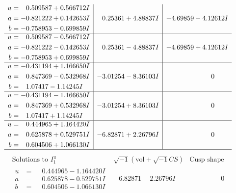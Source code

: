 \documentclass[1p]{elsarticle_modified}
\theoremstyle{definition}
\newcommand{\I}{\sqrt{-1}}
\begin{document}
$$\begin{array}{c|c|c}
\begin{aligned}
u &= \phantom{-}0.509587 + 0.566712 I \\
a &= -0.821222 + 0.142653 I \\
b &= -0.758953 - 0.699859 I\end{aligned}
 & \phantom{-}0.25361 + 4.88837 I & -4.69859 - 4.12612 I \\ \hline\begin{aligned}
u &= \phantom{-}0.509587 - 0.566712 I \\
a &= -0.821222 - 0.142653 I \\
b &= -0.758953 + 0.699859 I\end{aligned}
 & \phantom{-}0.25361 - 4.88837 I & -4.69859 + 4.12612 I \\ \hline\begin{aligned}
u &= -0.431194 + 1.166650 I \\
a &= \phantom{-}0.847369 - 0.532968 I \\
b &= \phantom{-}1.07417 - 1.14245 I\end{aligned}
 & -3.01254 - 8.36103 I & \phantom{-0.000000 } 0 \\ \hline\begin{aligned}
u &= -0.431194 - 1.166650 I \\
a &= \phantom{-}0.847369 + 0.532968 I \\
b &= \phantom{-}1.07417 + 1.14245 I\end{aligned}
 & -3.01254 + 8.36103 I & \phantom{-0.000000 } 0 \\ \hline\begin{aligned}
u &= \phantom{-}0.444965 + 1.164420 I \\
a &= \phantom{-}0.625878 + 0.529751 I \\
b &= \phantom{-}0.604506 + 1.066130 I\end{aligned}
 & -6.82871 + 2.26796 I & \phantom{-0.000000 } 0\\
 \hline 
 \end{array}$$\newpage$$\begin{array}{c|c|c}  
\text{Solutions to }I^u_{1}& \I (\text{vol} + \sqrt{-1}CS) & \text{Cusp shape}\\
 \hline 
\begin{aligned}
u &= \phantom{-}0.444965 - 1.164420 I \\
a &= \phantom{-}0.625878 - 0.529751 I \\
b &= \phantom{-}0.604506 - 1.066130 I\end{aligned}
 & -6.82871 - 2.26796 I & \phantom{-0.000000 } 0 \\ \hline\begin{aligned}

\end{aligned}
\end{array}$$
\end{document}
